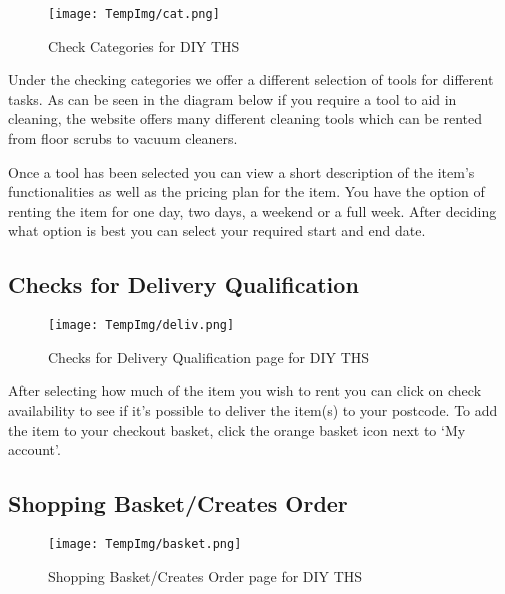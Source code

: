 \documentclass[fontsize=11pt]{extarticle}
\numberwithin{figure}{section} %
\numberwithin{table}{section}%
\begin{document}
\begin{figure}[H]
      \centering
      \texttt{[image: TempImg/cat.png]}
      \caption{Check Categories for DIY THS}
 \end{figure}

Under the checking categories we offer a different selection of tools
for different tasks. As can be seen in the diagram below if you require
a tool to aid in cleaning, the website offers many different cleaning
tools which can be rented from floor scrubs to vacuum cleaners.

Once a tool has been selected you can view a short description of the
item's functionalities as well as the pricing plan for the item. You
have the option of renting the item for one day, two days, a weekend or
a full week. After deciding what option is best you can select your
required start and end date.

\newpage

\hypertarget{checks-for-delivery-qualification}{%
\subsection{Checks for Delivery
Qualification}\label{checks-for-delivery-qualification}}

\begin{figure}[H]
      \centering
      \texttt{[image: TempImg/deliv.png]}
      \caption{Checks for Delivery Qualification page for DIY THS}
 \end{figure}

After selecting how much of the item you wish to rent you can click on
check availability to see if it's possible to deliver the item(s) to
your postcode. To add the item to your checkout basket, click the orange
basket icon next to `My account'.

\hypertarget{shopping-basketcreates-order}{%
\subsection{Shopping Basket/Creates
Order}\label{shopping-basketcreates-order}}

\begin{figure}[H]
      \centering
      \texttt{[image: TempImg/basket.png]}
      \caption{Shopping Basket/Creates Order page for DIY THS}
 \end{figure}
\end{document}
